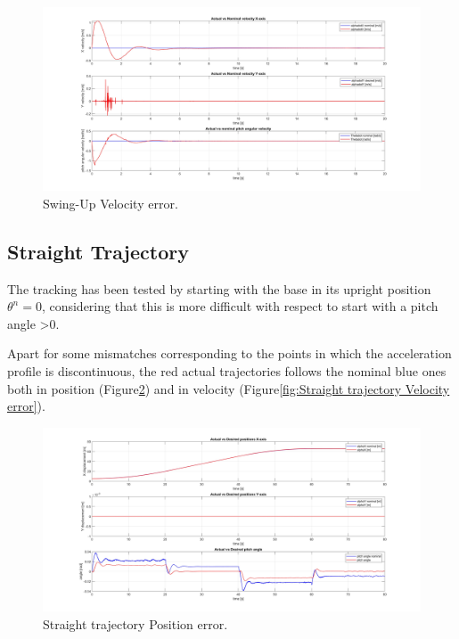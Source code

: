 \begin{figure}
    \centering
    \includegraphics[width=1\linewidth]{Images/Swing-Up/Velocity_error.jpg}
    \caption{Swing-Up Velocity error.}
    \label{fig:Swing-Up Velocity error}
\end{figure}

\subsection{Straight Trajectory}
\label{subsec:Straight Trajectory}

The tracking has been tested by starting with the base in its upright position $\theta^{n} = 0$, considering that this is more difficult with respect to start with a pitch angle >0.

Apart for some mismatches corresponding to the points in which the acceleration profile is discontinuous, the red actual trajectories follows the nominal blue ones both in position (Figure\ref{fig:Straight trajectory Position error}) and in velocity (Figure\ref{fig:Straight trajectory Velocity error}).

\begin{figure}
    \centering
    \includegraphics[width=1\linewidth]{Images/x-trajectory/Position_error.jpg}
    \caption{Straight trajectory Position error.}
    \label{fig:Straight trajectory Position error}
\end{figure}

